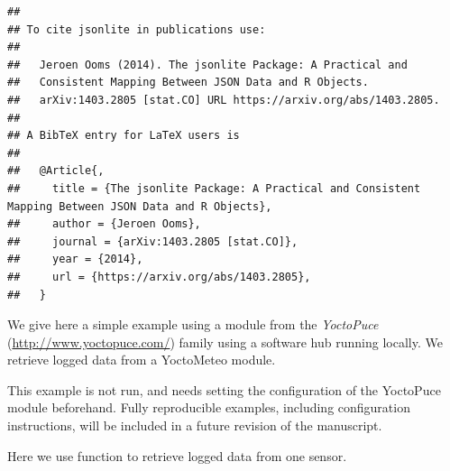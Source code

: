 \documentclass[krantz2]{krantz}\usepackage{knitr}%
\newcommand{\href}[2]{\emph{#2} (\url{#1})}
\begin{document}
\begin{knitrout}\footnotesize
{}\color{fgcolor}\begin{kframe}
\begin{alltt}
\hlstd{(} \hlstd{=} \hlstd{)}
\end{alltt}
\begin{verbatim}
## 
## To cite jsonlite in publications use:
## 
##   Jeroen Ooms (2014). The jsonlite Package: A Practical and
##   Consistent Mapping Between JSON Data and R Objects.
##   arXiv:1403.2805 [stat.CO] URL https://arxiv.org/abs/1403.2805.
## 
## A BibTeX entry for LaTeX users is
## 
##   @Article{,
##     title = {The jsonlite Package: A Practical and Consistent Mapping Between JSON Data and R Objects},
##     author = {Jeroen Ooms},
##     journal = {arXiv:1403.2805 [stat.CO]},
##     year = {2014},
##     url = {https://arxiv.org/abs/1403.2805},
##   }
\end{verbatim}
\end{kframe}
\end{knitrout}

We give here a simple example using a module from the \href{http://www.yoctopuce.com/}{YoctoPuce} family using a software hub running locally. We retrieve logged data from a YoctoMeteo module.

\begin{infobox}
This example is not run, and needs setting the configuration of the YoctoPuce module beforehand. Fully reproducible examples, including configuration instructions, will be included in a future revision of the manuscript.
\end{infobox}

Here we use function  to retrieve logged data from one sensor.

\begin{knitrout}\footnotesize
{}\color{fgcolor}\begin{kframe}
\begin{alltt}
 \hlkwb{<-} 
 \hlkwb{<-}
    \hlstd{(} \hlstd{,}
                    \hlstd{=} \hlstd{))}
\end{alltt}
\end{kframe}
\end{knitrout}
\end{document}
